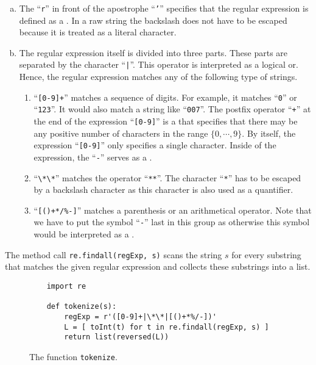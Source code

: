 \begin{enumerate}[(a)]
\item The ``\texttt{r}'' in front of the apostrophe ``\texttt{'}'' specifies that the regular expression is
      defined as a .  In a raw string the backslash does not have to be
      escaped because it is treated as a literal character.
\item The regular expression itself is divided into three parts.
      These parts are separated by the character ``\texttt{|}''.  This operator is interpreted as a logical or.
      Hence, the regular expression matches any of the following type of strings.
      \begin{enumerate}
      \item ``\texttt{[0-9]+}'' matches a sequence of digits.  For example, it matches ``\texttt{0}'' or
            ``\texttt{123}''.  It would also match a string like ``\texttt{007}''.
            The postfix operator ``\texttt{+}'' at the end of the expression ``\texttt{[0-9]}'' is a
             that specifies that there may be any positive number of characters in the range
            $\{0,\cdots,9\}$.  By itself, the expression ``\texttt{[0-9]}'' only specifies a single character.
            Inside of the expression, the ``\texttt{-}'' serves as a .
      \item ``\verb|\*\*|'' matches the operator ``\texttt{**}''.  The character ``\texttt{*}'' has to be
            escaped by a backslash character as this character is also used as a quantifier.
      \item ``\texttt{[()+*/\%-]}'' matches a parenthesis or an arithmetical operator. Note that we have 
            to put the symbol ``\texttt{-}'' last in this group as otherwise this symbol would be 
            interpreted as a .
     \end{enumerate}
\end{enumerate}
The method call \texttt{re.findall(regExp, s)} scans the string $s$ for every substring that matches the
given regular expression and collects these substrings into a list.


\begin{figure}[!ht]
\centering
\begin{verbatim}
    import re

    def tokenize(s):
        regExp = r'([0-9]+|\*\*|[()+*%/-])'
        L = [ toInt(t) for t in re.findall(regExp, s) ]
        return list(reversed(L))                 
\end{verbatim}
\vspace*{-0.3cm}
\caption{The function \texttt{tokenize}.}
\label{fig:tokenize.py}
\end{figure}

